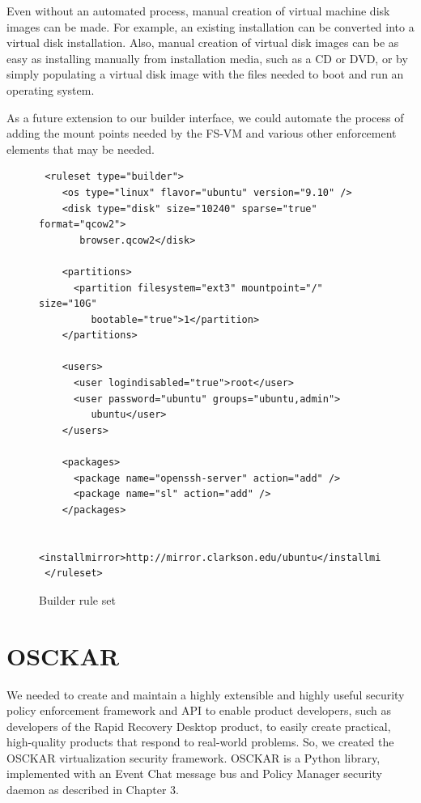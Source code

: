 Even without an automated process, manual creation of virtual machine disk images can be made. For example, an existing installation can be converted into a virtual disk installation. Also, manual creation of virtual disk images can be as easy as installing manually from installation media, such as a CD or DVD, or by simply populating a virtual disk image with the files needed to boot and run an operating system\cite{runningxen_book}.

As a future extension to our builder interface, we could automate the process of adding the mount points needed by the FS-VM and various other enforcement elements that may be needed.

\begin{figure}[tbp]
\caption{Builder rule set}
\label{lst:builder-ruleset}

\begin{lstlisting}
 <ruleset type="builder">
    <os type="linux" flavor="ubuntu" version="9.10" />
    <disk type="disk" size="10240" sparse="true" format="qcow2">
       browser.qcow2</disk>

    <partitions>
      <partition filesystem="ext3" mountpoint="/" size="10G" 
         bootable="true">1</partition>
    </partitions>

    <users>
      <user logindisabled="true">root</user>
      <user password="ubuntu" groups="ubuntu,admin">
         ubuntu</user>
    </users>
    
    <packages>
      <package name="openssh-server" action="add" />
      <package name="sl" action="add" />    
    </packages>

    <installmirror>http://mirror.clarkson.edu/ubuntu</installmirror>
 </ruleset>
\end{lstlisting}
\end{figure}

\section{OSCKAR}

We needed to create and maintain a highly extensible and highly useful security policy
enforcement framework and API to enable product developers, such as developers of the Rapid Recovery Desktop product, to easily create practical, high-quality products that respond to real-world problems. So, we created the OSCKAR virtualization security framework. OSCKAR is a Python library, implemented with an Event Chat message bus and Policy Manager security daemon as described in Chapter 3. 

